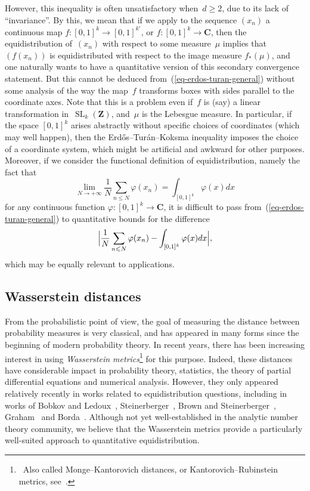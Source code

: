 \documentclass[12pt]{amsart}
\renewcommand{\leq}{\leqslant}
\renewcommand{\geq}{\geqslant}
\newcommand{\Cc}{\mathbf{C}}
\newcommand{\Zz}{\mathbf{Z}}
\DeclareMathOperator{\SL}{SL}
\theoremstyle{plain}
\theoremstyle{remark}
\theoremstyle{definition}
\renewcommand{\geq}{\geqslant}
\renewcommand{\leq}{\leqslant}
\begin{document}
However, this inequality is often unsatisfactory when~$d\geq 2$, due to
its lack of \enquote{invariance}. By this, we mean that if we apply to
the sequence $(x_n)$ a continuous map $f\colon [0,1]^k\to [0,1]^{k'}$,
or $f\colon [0,1]^k\to\Cc$, then the equidistribution of~$(x_n)$ with
respect to some measure~$\mu$ implies that~$(f(x_n))$ is equidistributed
with respect to the image measure $f_*(\mu)$, and one naturally wants to
have a quantitative version of this secondary convergence statement. But
this cannot be deduced from~(\ref{eq-erdos-turan-general}) without some
analysis of the way the map~$f$ transforms boxes with sides parallel to
the coordinate axes. Note that this is a problem even if~$f$ is (say) a
linear transformation in~$\SL_k(\Zz)$, and~$\mu$ is the Lebesgue
measure.  In particular, if the space $[0,1]^k$ arises abstractly
without specific choices of coordinates (which may well happen), then
the Erd\H os--Turán--Koksma inequality imposes the choice of a
coordinate system, which might be artificial and awkward for other
purposes. Moreover, if we consider the functional definition of
equidistribution, namely the fact that
\[
  \lim_{N\to +\infty} \frac{1}{N}\sum_{n\leq
    N}\varphi(x_n)=\int_{[0,1]^k}\varphi(x)dx
\]
for any continuous function $\varphi\colon [0,1]^k\to \Cc$, it is
difficult to pass from~(\ref{eq-erdos-turan-general}) to quantitative
bounds for the difference
\[
  \Bigl|\frac{1}{N}\sum_{n\leq
    N}\varphi(x_n)-\int_{[0,1]^k}\varphi(x)dx\Bigr|,
\]
which may be equally relevant to applications.

\subsection{Wasserstein distances}

From the probabilistic point of view, the goal of measuring the distance
between probability measures is very classical, and has appeared in many
forms since the beginning of modern probability theory. In recent years,
there has been increasing interest in using \emph{Wasserstein
  metrics}\footnote{\ Also called Monge--Kantorovich distances, or
  Kantorovich--Rubinstein metrics, see~\cite[p.\,206]{villani}.} for
this purpose. Indeed, these distances have considerable impact in
probability theory, statistics, the theory of partial differential
equations and numerical analysis.  However, they only appeared
relatively recently in works related to equidistribution questions,
including in works of Bobkov and Ledoux~\cite{bl_gaussian},
Steinerberger~\cite{steinerberger}, Brown and
Steinerberger~\cite{brown-steinerberger}, Graham~\cite{graham} and
Borda~\cite{borda_bernoulli,borda_berry_esseen}. Although not yet
well-established in the analytic number theory community, we believe
that the Wasserstein metrics provide a particularly well-suited approach
to quantitative equidistribution.
\end{document}
